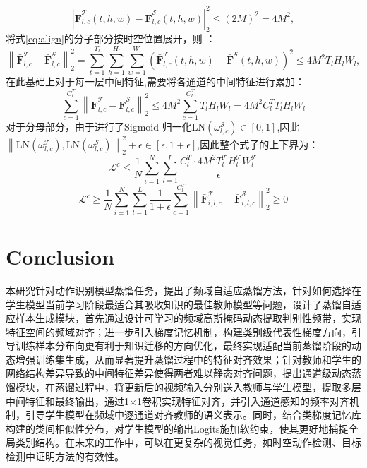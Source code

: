 \documentclass[10.5pt,letterpaper]{article}
\begin{document}
\begin{equation}
 \left| \bar{\textbf{F}}_{l,c}^\mathcal{T}(t,h,w) - \bar{\textbf{F}}_{l,c}^\mathcal{S}(t,h,w) \right|_2^2\leq (2M)^2=4M^2,
\end{equation}
将式\ref{eq:align}的分子部分按时空位置展开，则 ：
\begin{equation}
\left\| \bar{\textbf{F}}_{l,c}^\mathcal{T} - \bar{\textbf{F}}_{l,c}^\mathcal{S} \right\|_2^2 = 
\sum_{t=1}^{T_l} \sum_{h=1}^{H_l} \sum_{w=1}^{W_l} 
\left( \bar{\textbf{F}}_{l,c}^\mathcal{T}(t,h,w) - \bar{\textbf{F}}^\mathcal{S}(t,h,w) \right)^2\leq 4M^2T_lH_lW_l,
\label{eq:euclidean_expansion}
\end{equation}
在此基础上对于每一层中间特征,需要将各通道的中间特征进行累加：
\begin{equation}
\sum_{c=1}^{C_l^T} \left\| \bar{\textbf{F}}_{l,c}^\mathcal{T} - \bar{\textbf{F}}_{l,c}^\mathcal{S} \right\|_2^2 \leq 
4M^2 \sum_{c=1}^{C_l^T} T_l H_l W_l = 
4M^2 C_l^T T_l H_l W_l
\label{eq:channel_extension}
\end{equation}
对于分母部分，由于进行了Sigmoid 归一化$\text{LN}(\omega_{l,c}^\mathcal{S})\in[0,1]$,因此$\left\| \text{LN}(\omega_{l,c}^\mathcal{T}), \text{LN}(\omega_{l,c}^\mathcal{S}) \right\|_2^2+\epsilon\in[\epsilon,1+\epsilon]$,因此整个式子的上下界为：
\begin{equation}
\mathcal{L}^{c} \leq  \frac{1}{N} \sum_{i=1}^{N} \sum_{l=1}^{L} \frac{C_l^T \cdot 4M^2 T_l^\mathcal{T} H_l^\mathcal{T} W_l^\mathcal{T}}{\epsilon}
\end{equation}
\begin{equation}
\mathcal{L}^{c} \geq \frac{1}{N} \sum_{i=1}^{N} \sum_{l=1}^{L} \frac{1}{1+\epsilon} \sum_{c=1}^{C_l^T} \left\| \bar{\textbf{F}}_{i,l,c}^\mathcal{T} - \bar{\textbf{F}}_{i,l,c}^\mathcal{S} \right\|_2^2 \geq 0
\end{equation}


\section{Conclusion}
 
 本研究针对动作识别模型蒸馏任务，提出了频域自适应蒸馏方法，针对如何选择在学生模型当前学习阶段最适合其吸收知识的最佳教师模型等问题，设计了蒸馏自适应样本生成模块，首先通过设计可学习的频域高斯掩码动态提取判别性频带，实现特征空间的频域对齐；进一步引入梯度记忆机制，构建类别级代表性梯度方向，引导训练样本分布向更有利于知识迁移的方向优化，最终实现适配当前蒸馏阶段的动态增强训练集生成，从而显著提升蒸馏过程中的特征对齐效果；针对教师和学生的网络结构差异导致的中间特征差异使得两者难以静态对齐问题，提出通道级动态蒸馏模块，在蒸馏过程中，将更新后的视频输入分别送入教师与学生模型，提取多层中间特征和最终输出，通过1×1卷积实现特征对齐，并引入通道感知的频率对齐机制，引导学生模型在频域中逐通道对齐教师的语义表示。同时，结合类梯度记忆库构建的类间相似性分布，对学生模型的输出Logits施加软约束，使其更好地捕捉全局类别结构。在未来的工作中，可以在更复杂的视觉任务，如时空动作检测、目标检测中证明方法的有效性。

\end{document}
